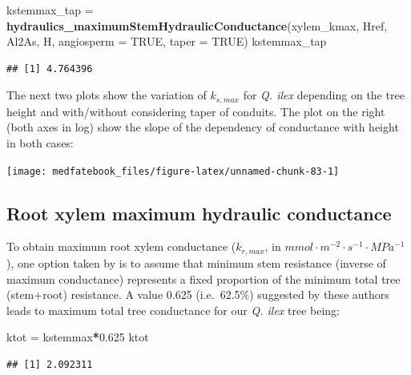 \documentclass[]{book}
\newenvironment{Shaded}{\begin{snugshade}}{\end{snugshade}}
\newcommand{\KeywordTok}[1]{\textcolor[rgb]{0.13,0.29,0.53}{\textbf{#1}}}
\newcommand{\DataTypeTok}[1]{\textcolor[rgb]{0.13,0.29,0.53}{#1}}
\newcommand{\FloatTok}[1]{\textcolor[rgb]{0.00,0.00,0.81}{#1}}
\newcommand{\StringTok}[1]{\textcolor[rgb]{0.31,0.60,0.02}{#1}}
\newcommand{\OtherTok}[1]{\textcolor[rgb]{0.56,0.35,0.01}{#1}}
\newcommand{\OperatorTok}[1]{\textcolor[rgb]{0.81,0.36,0.00}{\textbf{#1}}}
\newcommand{\NormalTok}[1]{#1}
\begin{document}
\begin{Shaded}
\begin{Highlighting}[]
\NormalTok{kstemmax_tap =}\StringTok{ }\KeywordTok{hydraulics_maximumStemHydraulicConductance}\NormalTok{(xylem_kmax, }
\NormalTok{                      Href, Al2As, H, }\DataTypeTok{angiosperm =} \OtherTok{TRUE}\NormalTok{, }\DataTypeTok{taper =} \OtherTok{TRUE}\NormalTok{)}
\NormalTok{kstemmax_tap}
\end{Highlighting}
\end{Shaded}

\begin{verbatim}
## [1] 4.764396
\end{verbatim}

The next two plots show the variation of \(k_{s,max}\) for \emph{Q. ilex} depending on the tree height and with/without considering taper of conduits. The plot on the right (both axes in log) show the slope of the dependency of conductance with height in both cases:

\begin{center}\texttt{[image: medfatebook\_files/figure-latex/unnamed-chunk-83-1]} \end{center}

\hypertarget{root-xylem-maximum-hydraulic-conductance}{%
\subsection{Root xylem maximum hydraulic conductance}\label{root-xylem-maximum-hydraulic-conductance}}

To obtain maximum root xylem conductance (\(k_{r, max}\), in \(mmol \cdot m^{-2} \cdot s^{-1} \cdot MPa^{-1}\)), one option taken by \citet{Christoffersen2016} is to assume that minimum stem resistance (inverse of maximum conductance) represents a fixed proportion of the minimum total tree (stem+root) resistance. A value 0.625 (i.e.~62.5\%) suggested by these authors leads to maximum total tree conductance for our \emph{Q. ilex} tree being:

\begin{Shaded}
\begin{Highlighting}[]
\NormalTok{ktot =}\StringTok{ }\NormalTok{kstemmax}\OperatorTok{*}\FloatTok{0.625}
\NormalTok{ktot}
\end{Highlighting}
\end{Shaded}

\begin{verbatim}
## [1] 2.092311
\end{verbatim}
\end{document}
